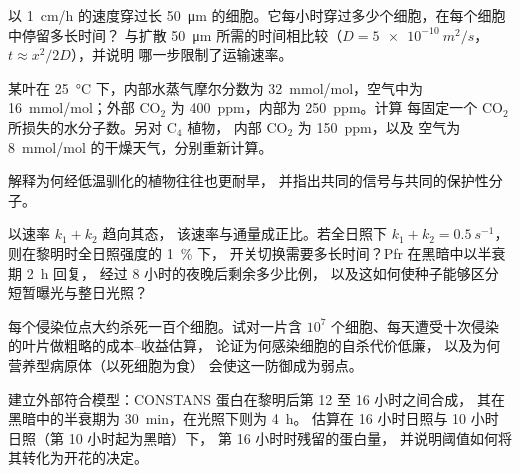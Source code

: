 \begin{exercise}[$\star\star$]\label{exo:b3:plant-molecular-physiology:7}
以 \qty{1}{cm/h} 的速度穿过长 \qty{50}{\micro m}
的细胞。它每小时穿过多少个细胞，在每个细胞中停留多长时间？
与扩散 \qty{50}{\micro m} 所需的时间相比较（$D =
\qty{5e-10}{m^2/s}$，$t \approx x^{2}/2D$），并说明
哪一步限制了运输速率。
\end{exercise}

\begin{exercise}[$\star\star$]\label{exo:b3:plant-molecular-physiology:8}
某叶在 \qty{25}{\celsius} 下，内部水蒸气摩尔分数为
\qty{32}{mmol/mol}，空气中为 \qty{16}{mmol/mol}；外部 CO$_{2}$ 为
\qty{400}{ppm}，内部为 \qty{250}{ppm}。计算
每固定一个 CO$_{2}$ 所损失的水分子数。另对 C$_{4}$ 植物，
内部 CO$_{2}$ 为 \qty{150}{ppm}，以及
空气为 \qty{8}{mmol/mol} 的干燥天气，分别重新计算。
\end{exercise}

\begin{exercise}[$\star\star$]\label{exo:b3:plant-molecular-physiology:9}
解释为何经低温驯化的植物往往也更耐旱，
并指出共同的信号与共同的保护性分子。
\end{exercise}

\begin{exercise}[$\star\star\star$]\label{exo:b3:plant-molecular-physiology:10}
以速率 $k_{1} + k_{2}$ 趋向其态，
该速率与通量成正比。若全日照下 $k_{1} + k_{2} =
\qty{0.5}{s^{-1}}$，则在黎明时全日照强度的 \qty{1}{\%} 下，
开关切换需要多长时间？Pfr 在黑暗中以半衰期 \qty{2}{h} 回复，
经过 8 小时的夜晚后剩余多少比例，
以及这如何使种子能够区分短暂曝光与整日光照？
\end{exercise}

\begin{exercise}[$\star\star\star$]\label{exo:b3:plant-molecular-physiology:11}
每个侵染位点大约杀死一百个细胞。试对一片含
$10^{7}$ 个细胞、每天遭受十次侵染的叶片做粗略的成本–收益估算，
论证为何感染细胞的自杀代价低廉，
以及为何营养型病原体（以死细胞为食）
会使这一防御成为弱点。
\end{exercise}

\begin{exercise}[$\star\star\star$]\label{exo:b3:plant-molecular-physiology:12}
建立外部符合模型：CONSTANS 蛋白在黎明后第 12 至 16 小时之间合成，
其在黑暗中的半衰期为 \qty{30}{min}，在光照下则为 \qty{4}{h}。
估算在 16 小时日照与 10 小时日照（第 10 小时起为黑暗）下，
第 16 小时时残留的蛋白量，
并说明阈值如何将其转化为开花的决定。
\end{exercise}

